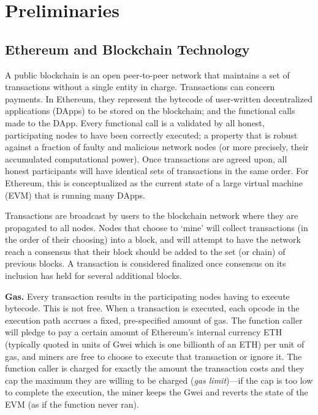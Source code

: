 
\section{Preliminaries}

\subsection{Ethereum and Blockchain Technology}

A public blockchain is an open peer-to-peer network that maintains a set of transactions without a single entity in charge. Transactions can concern payments.  In Ethereum, they represent the bytecode of user-written decentralized applications (DApps) to be stored on the blockchain; and the functional calls made to the DApp. Every functional call is a validated by all honest, participating nodes to have been correctly executed; a property that is robust against a fraction of faulty and malicious network nodes (or more precisely, their accumulated computational power). Once transactions are agreed upon, all honest participants will have identical sets of transactions in the same order. For Ethereum, this is conceptualized as the current state of a large virtual machine (EVM) that is running many DApps. 

Transactions are broadcast by users to the blockchain network where they are propagated to all nodes. Nodes that choose to `mine' will collect transactions (in the order of their choosing) into a block, and will attempt to have the network reach a consensus that their block should be added to the set (or chain) of previous blocks. A transaction is considered finalized once consensus on its inclusion has held for several additional blocks.

\textbf{Gas.} Every transaction results in the participating nodes having to execute bytecode. This is not free. When a transaction is executed, each opcode in the execution path accrues a fixed, pre-specified amount of gas. The function caller will pledge to pay a certain amount of Ethereum's internal currency ETH (typically quoted in units of Gwei which is one billionth of an ETH) per unit of gas, and miners are free to choose to execute that transaction or ignore it. The function caller is charged for exactly the amount the transaction costs and they cap the maximum they are willing to be charged (\textit{gas limit})---if the cap is too low to complete the execution, the miner keeps the Gwei and reverts the state of the EVM (as if the function never ran).

